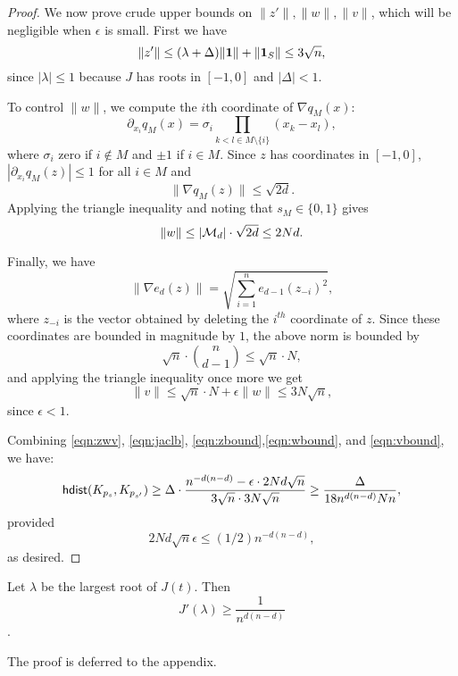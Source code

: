 \begin{proof}
We now prove crude upper bounds on $\|z'\|,\|w\|, \|v\|$, which will be negligible when $\epsilon$ is small. First we have
\begin{equation}\label{eqn:zbound}\|z'\|\le (\lambda+\Delta)\|\one\|+\|\one_S\|\le 3\sqrt{n},\end{equation}
since $|\lambda|\le 1$ because $J$ has roots in $[-1,0]$ and $|\Delta|<1.$

To control $\|w\|$, we compute the $i$th coordinate of $\nabla q_M(x)$:
$$\partial_{x_i} q_M(x)=\sigma_i\prod_{k<l\in M\setminus\{i\}} (x_k-x_l),$$
where $\sigma_i$ zero if $i\notin M$ and $\pm 1$ if $i\in M$. Since $z$ has coordinates in $[-1,0]$, $|\partial_{x_i}q_M(z)|\le 1$ for all $i\in M$ and 
$$\|\nabla q_M(z)\|\le \sqrt{2d}.$$
Applying the triangle inequality and noting that $s_M\in \{0,1\}$ gives
\begin{equation}\label{eqn:wbound} \|w\|\le |\M_d|\cdot \sqrt{2d}\le 2Nd.\end{equation}

Finally, we have
$$\|\nabla e_d(z)\|=\sqrt{\sum_{i=1}^ne_{d-1}(z_{-i})^2},$$
where $z_{-i}$ is the vector obtained by deleting the $i^{th}$ coordinate of $z$. Since these coordinates are bounded in magnitude by $1$, the above norm is bounded by
$$ \sqrt{n}\cdot\binom{n}{d-1}\le \sqrt{n}\cdot N,$$
and applying the triangle inequality once more we get
\begin{equation} \label{eqn:vbound}\|v\|\le \sqrt{n}\cdot N + \epsilon\|w\|\le 3N\sqrt{n},\end{equation}
since $\epsilon<1$.

Combining \eqref{eqn:zwv}, \eqref{eqn:jaclb}, \eqref{eqn:zbound},\eqref{eqn:wbound}, and \eqref{eqn:vbound}, we have:
$$\mathsf{hdist}(K_{p_s},K_{p_{s'}})\ge \Delta\cdot \frac{n^{-d(n-d)}-\epsilon\cdot 2Nd\sqrt{n}}{3\sqrt{n}\cdot 3N\sqrt{n}}\ge \frac{\Delta}{18n^{d(n-d)}Nn},$$
provided
$$2Nd\sqrt{n}\epsilon \le (1/2)n^{-d(n-d)},$$
as desired.
\end{proof}

\begin{lemma}\label{lem:jacobi} Let $\lambda$ be the largest root of $J(t)$. Then
$$J'(\lambda)\ge \frac{1}{n^{d(n-d)}}$$.
\end{lemma}
The proof is deferred to the appendix.

